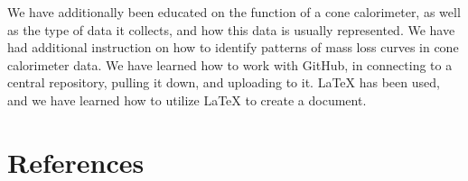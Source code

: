 \documentclass{abstract}
\begin{document}

We have additionally been educated on the function of a cone calorimeter, as well as the type of data it collects, and how this data is usually represented. We have had additional instruction on how to identify patterns of mass loss curves in cone calorimeter data. We have learned how to work with GitHub, in connecting to a central repository, pulling it down, and uploading to it. LaTeX has been used, and we have learned how to utilize LaTeX to create a document. 

 \cite{babrauskas1982development, brown1988cone,emil1989flammability}


\section{References}
\end{document}
